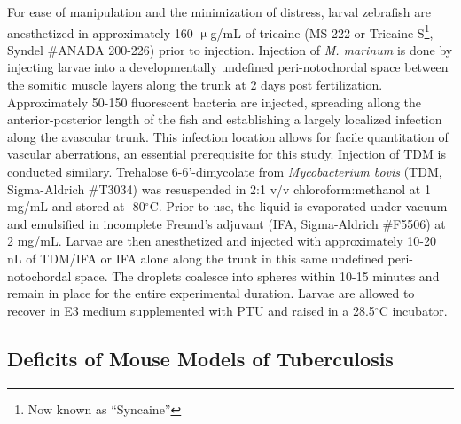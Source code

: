For ease of manipulation and the minimization of distress, larval zebrafish are anesthetized in approximately 160 $\upmu$g/mL of tricaine (MS-222 or Tricaine-S\footnote{Now known as ``Syncaine''}, Syndel \#ANADA 200-226) prior to injection. Injection of \textit{M. marinum} is done by injecting larvae into a developmentally undefined peri-notochordal space between the somitic muscle layers along the trunk at 2 days post fertilization. Approximately 50-150 fluorescent bacteria are injected, spreading allong the anterior-posterior length of the fish and establishing a largely localized infection along the avascular trunk. This infection location allows for facile quantitation of vascular aberrations, an essential prerequisite for this study. Injection of TDM is conducted similary. Trehalose 6-6'-dimycolate from \textit{Mycobacterium bovis} (TDM, Sigma-Aldrich \#T3034) was resuspended in 2:1 v/v chloroform:methanol at 1 mg/mL and stored at -80$^{\circ}$C. Prior to use, the liquid is evaporated under vacuum and emulsified in incomplete Freund's adjuvant (IFA, Sigma-Aldrich \#F5506) at 2 mg/mL. Larvae are then anesthetized and injected with approximately 10-20 nL of TDM/IFA or IFA alone along the trunk in this same undefined peri-notochordal space. The droplets coalesce into spheres within 10-15 minutes and remain in place for the entire experimental duration. Larvae are allowed to recover in E3 medium supplemented with PTU and raised in a 28.5$^{\circ}$C incubator.

\subsection{Deficits of Mouse Models of Tuberculosis}\label{mouse}

